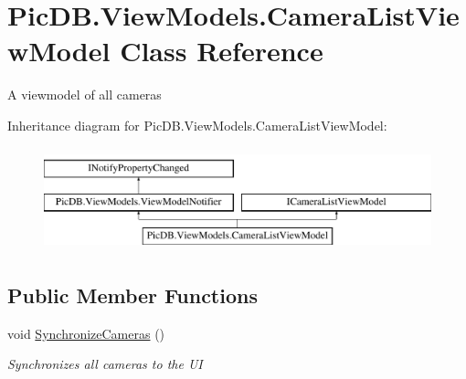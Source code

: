\hypertarget{class_pic_d_b_1_1_view_models_1_1_camera_list_view_model}{}\section{Pic\+D\+B.\+View\+Models.\+Camera\+List\+View\+Model Class Reference}
\label{class_pic_d_b_1_1_view_models_1_1_camera_list_view_model}


A viewmodel of all cameras  


Inheritance diagram for Pic\+D\+B.\+View\+Models.\+Camera\+List\+View\+Model\+:\begin{figure}[H]
\begin{center}
\leavevmode
\includegraphics[height=3.000000cm]{class_pic_d_b_1_1_view_models_1_1_camera_list_view_model}
\end{center}
\end{figure}
\subsection*{Public Member Functions}
\begin{DoxyCompactItemize}
\item 
void \mbox{\hyperlink{class_pic_d_b_1_1_view_models_1_1_camera_list_view_model_a7bf15c41092b0fb555a5b0943bc81807}{Synchronize\+Cameras}} ()
\begin{DoxyCompactList}\small\item\em Synchronizes all cameras to the UI \end{DoxyCompactList}\end{DoxyCompactItemize}

